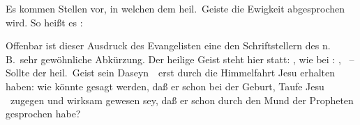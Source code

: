  Es kommen Stellen vor, in welchen dem heil.\ Geiste die Ewigkeit abgesprochen wird. So heißt es : \par
{} Offenbar ist dieser Ausdruck des Evangelisten eine den Schriftstellern des n.\,B.\ sehr gewöhnliche Abkürzung. Der heilige Geist steht hier statt: , wie bei : , \uam\  -- Sollte der heil.\ Geist sein Daseyn~\ erst durch die Himmelfahrt Jesu erhalten haben: wie könnte gesagt werden, daß er schon bei der Geburt, Taufe Jesu \usw\ zugegen und wirksam gewesen sey, daß er schon durch den Mund der Propheten gesprochen habe? \usw\



